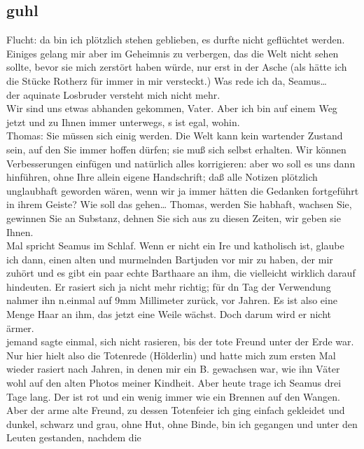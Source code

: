 \documentclass[
]{article}
\author{}
\date{\vspace{-2.5em}}
\begin{document}
\subsection{guhl}\label{guhl}

Flucht: da bin ich plötzlich stehen geblieben, es durfte nicht
geflüchtet werden. Einiges gelang mir aber im Geheimnis zu verbergen,
das die Welt nicht sehen sollte, bevor sie mich zerstört haben würde,
nur erst in der Asche (als hätte ich die Stücke
Rotherz\textquotesingle\textquotesingle{} für immer in mir versteckt.)
Was rede ich da, Seamus\ldots{}\\
der aquinate Losbruder versteht mich nicht mehr.\\
Wir sind uns etwas abhanden gekommen, Vater. Aber ich bin auf einem Weg
jetzt und zu Ihnen immer unterwegs, \textquotesingle s ist egal,
wohin.\\
Thomas: Sie müssen sich einig werden. Die Welt kann kein wartender
Zustand sein, auf den Sie immer hoffen dürfen; sie muß sich selbst
erhalten. Wir können Verbesserungen einfügen und natürlich alles
korrigieren: aber wo soll es uns dann hinführen, ohne Ihre allein eigene
Handschrift; daß alle Notizen plötzlich unglaubhaft geworden wären, wenn
wir ja immer hätten die Gedanken fortgeführt in ihrem Geiste? Wie soll
das gehen\ldots{} Thomas, werden Sie habhaft, wachsen Sie, gewinnen Sie
an Substanz, dehnen Sie sich aus zu diesen Zeiten, wir geben sie
Ihnen.\\
Mal spricht Seamus im Schlaf. Wenn er nicht ein Ire und katholisch ist,
glaube ich dann, einen alten und murmelnden Bartjuden vor mir zu haben,
der mir zuhört und es gibt ein paar echte Barthaare an ihm, die
vielleicht wirklich darauf hindeuten. Er rasiert sich ja nicht mehr
richtig; für dn Tag der Verwendung nahmer ihn n.einmal auf 9mm
Millimeter zurück, vor Jahren. Es ist also eine Menge Haar an ihm, das
jetzt eine Weile wächst. Doch darum wird er nicht ärmer.\\
jemand sagte einmal, sich nicht rasieren, bis der tote Freund unter der
Erde war.\\
Nur hier hielt also die Totenrede (Hölderlin) und hatte mich zum ersten
Mal wieder rasiert nach Jahren, in denen mir ein B. gewachsen war, wie
ihn Väter wohl auf den alten Photos meiner Kindheit. Aber heute trage
ich Seamus drei Tage lang. Der ist rot und ein wenig immer wie ein
Brennen auf den Wangen. Aber der arme alte Freund, zu dessen Totenfeier
ich ging einfach gekleidet und dunkel, schwarz und grau, ohne Hut, ohne
Binde, bin ich gegangen und unter den Leuten gestanden, nachdem die
\end{document}
